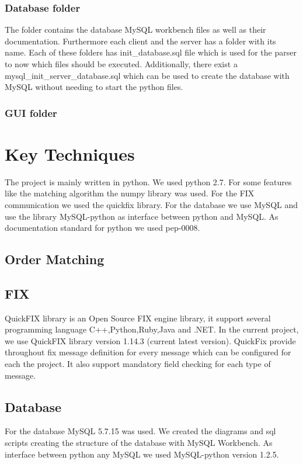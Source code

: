 \documentclass[a4paper, 11pt]{article}
\begin{document}
\subsubsection*{Database folder} 
The folder contains the database MySQL workbench files as well as their documentation. Furthermore each client and the server has
a folder with its name. Each of these folders has init\_database.sql file which is used for the parser to now which files should be
executed. Additionally, there exist a mysql\_init\_server\_database.sql which can be used to create the database with MySQL without
needing to start the python files.

\subsubsection*{GUI folder}

\section*{Key Techniques}

The project is mainly written in python. We used python 2.7. For some features like the matching algorithm the numpy library \cite{numpy} was used.
For the FIX communication we used the quickfix library. For the database we use MySQL and use the library MySQL-python as interface between python and MySQL.
As documentation standard for python we used pep-0008.
\subsection*{Order Matching}

\subsection*{FIX}
QuickFIX library is an Open Source FIX engine library, it support several programming language C++,Python,Ruby,Java and .NET. 
In the current project, we use QuickFIX library version 1.14.3 (current latest version). QuickFix provide throughout fix message definition for every message which can be configured for each the project.
It also support mandatory field checking for each type of message.
\subsection*{Database}

For the database MySQL 5.7.15 was used. We created the diagrams and sql scripts creating the structure of the database with MySQL Workbench.
As interface between python any MySQL we used MySQL-python version 1.2.5.
\end{document}
